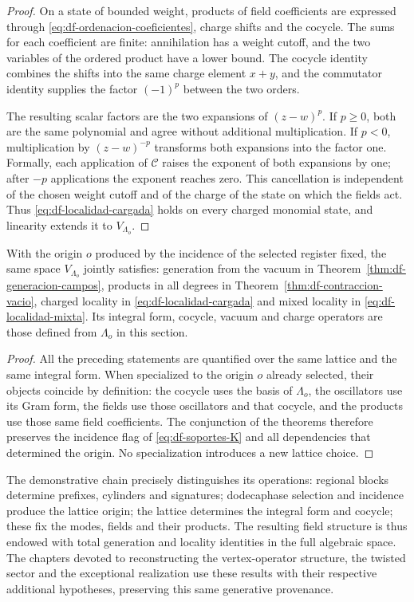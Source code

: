 \begin{proof}
On a state of bounded weight, products of field coefficients are expressed through \eqref{eq:df-ordenacion-coeficientes}, charge shifts and the cocycle. The sums for each coefficient are finite: annihilation has a weight cutoff, and the two variables of the ordered product have a lower bound. The cocycle identity combines the shifts into the same charge element \(x+y\), and the commutator identity supplies the factor \((-1)^p\) between the two orders.

The resulting scalar factors are the two expansions of \((z-w)^p\). If \(p\geq0\), both are the same polynomial and agree without additional multiplication. If \(p<0\), multiplication by \((z-w)^{-p}\) transforms both expansions into the factor one. Formally, each application of \(\mathcal C\) raises the exponent of both expansions by one; after \(-p\) applications the exponent reaches zero. This cancellation is independent of the chosen weight cutoff and of the charge of the state on which the fields act. Thus \eqref{eq:df-localidad-cargada} holds on every charged monomial state, and linearity extends it to \(V_{\Lambda_o}\).
\end{proof}

\begin{theorem}
\label{thm:df-composicion-campos} With the origin \(o\) produced by the incidence of the selected register fixed, the same space \(V_{\Lambda_o}\) jointly satisfies: generation from the vacuum in Theorem~\ref{thm:df-generacion-campos}, products in all degrees in Theorem~\ref{thm:df-contraccion-vacio}, charged locality in \eqref{eq:df-localidad-cargada} and mixed locality in \eqref{eq:df-localidad-mixta}. Its integral form, cocycle, vacuum and charge operators are those defined from \(\Lambda_o\) in this section.
\end{theorem}

\begin{proof}
All the preceding statements are quantified over the same lattice and the same integral form. When specialized to the origin \(o\) already selected, their objects coincide by definition: the cocycle uses the basis of \(\Lambda_o\), the oscillators use its Gram form, the fields use those oscillators and that cocycle, and the products use those same field coefficients. The conjunction of the theorems therefore preserves the incidence flag of \eqref{eq:df-soportes-K} and all dependencies that determined the origin. No specialization introduces a new lattice choice.
\end{proof}

The demonstrative chain precisely distinguishes its operations: regional blocks determine prefixes, cylinders and signatures; dodecaphase selection and incidence produce the lattice origin; the lattice determines the integral form and cocycle; these fix the modes, fields and their products. The resulting field structure is thus endowed with total generation and locality identities in the full algebraic space. The chapters devoted to reconstructing the vertex-operator structure, the twisted sector and the exceptional realization use these results with their respective additional hypotheses, preserving this same generative provenance.
